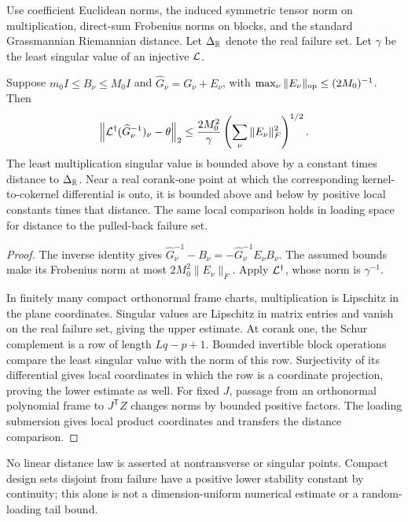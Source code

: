 Use coefficient Euclidean norms, the induced symmetric tensor norm on multiplication, direct-sum Frobenius norms on blocks, and the standard Grassmannian Riemannian distance. Let $\Delta_\mathbb R$ denote the real failure set. Let $\gamma$ be the least singular value of an injective $\mathcal L$.
\begin{theorem}\label{thm:stability}
Suppose $m_0I\le B_\nu\le M_0I$ and $\widehat G_\nu=G_\nu+E_\nu$, with $\max_\nu\|E_\nu\|_{\rm op}\le(2M_0)^{-1}$. Then
\begin{equation}\label{eq:stable}
 \left\|\mathcal L^\dagger(\widehat G_\nu^{-1})_\nu-\theta\right\|_2
 \le\frac{2M_0^2}{\gamma}\left(\sum_\nu\|E_\nu\|_F^2\right)^{1/2}.
\end{equation}
The least multiplication singular value is bounded above by a constant times distance to $\Delta_\mathbb R$. Near a real corank-one point at which the corresponding kernel-to-cokernel differential is onto, it is bounded above and below by positive local constants times that distance. The same local comparison holds in loading space for distance to the pulled-back failure set.
\end{theorem}
\begin{proof}
The inverse identity gives
$\widehat G_\nu^{-1}-B_\nu=-\widehat G_\nu^{-1}E_\nu B_\nu$.
The assumed bounds make its Frobenius norm at most $2M_0^2\|E_\nu\|_F$. Apply $\mathcal L^\dagger$, whose norm is $\gamma^{-1}$.

In finitely many compact orthonormal frame charts, multiplication is Lipschitz in the plane coordinates. Singular values are Lipschitz in matrix entries and vanish on the real failure set, giving the upper estimate. At corank one, the Schur complement is a row of length $Lq-p+1$. Bounded invertible block operations compare the least singular value with the norm of this row. Surjectivity of its differential gives local coordinates in which the row is a coordinate projection, proving the lower estimate as well. For fixed $J$, passage from an orthonormal polynomial frame to $J^{\mathsf T}Z$ changes norms by bounded positive factors. The loading submersion gives local product coordinates and transfers the distance comparison.
\end{proof}
No linear distance law is asserted at nontransverse or singular points. Compact design sets disjoint from failure have a positive lower stability constant by continuity; this alone is not a dimension-uniform numerical estimate or a random-loading tail bound.

